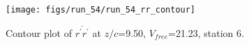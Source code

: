 \begin{figure}[H]
\centering
\texttt{[image: figs/run\_54/run\_54\_rr\_contour]}
\caption{Contour plot of $\overline{r^\prime r^\prime}$ at $z/c$=9.50, $V_{free}$=21.23, station 6.}
\label{fig:run_54_rr_contour}
\end{figure}


